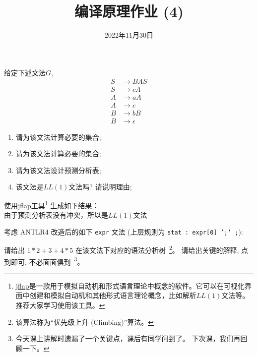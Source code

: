 \documentclass[a4paper, justified]{tufte-handout}
\title{编译原理作业 (4)}
\date{2022年11月30日}
\begin{document}
\maketitle
\noplagiarism %
\begin{abstract}
\end{abstract}
\beginrequired

\begin{problem}
  给定下述文法$G$,
  \begin{align}
    S &\to BAS \\[8pt]
    S &\to cA \\[8pt]
    A &\to aA \\[8pt]
    A &\to e \\[8pt]
    B &\to bB \\[8pt]
    B &\to \epsilon
  \end{align}

  \begin{enumerate}[(1)]
    \item 请为该文法计算必要的\first{}集合;
    \item 请为该文法计算必要的\follow{}集合;
    \item 请为该文法设计预测分析表;
    \item 该文法是$LL(1)$文法吗? 请说明理由;
  \end{enumerate}
\end{problem}

\begin{solution}
  使用jflap工具\footnote{
  	\href{https://www.jflap.org/jflaptmp/}{jflap}是一款用于模拟自动机和形式语言理论中概念的软件。它可以在可视化界面中创建和模拟自动机和其他形式语言理论概念，比如解析$LL(1)$文法等。推荐大家学习使用该工具。
  }
  生成如下结果：\\
  由于预测分析表没有冲突，所以是$LL(1)$文法
\end{solution}

\pagebreak
\begin{problem}
  考虑 ANTLR4 改造后的如下 \texttt{expr} 文法
  (上层规则为 \texttt{stat : expr[0] ';' ;}):


  \noindent 请给出 $1 \ast 2 + 3 + 4 \ast 5$
  在该文法下对应的语法分析树~\footnote{该算法称为``优先级上升 (Climbing)''算法。}。
  请给出关键的解释, 点到即可, 不必面面俱到~\footnote{
    今天课上讲解时遗漏了一个关键点，课后有同学问到了。
    下次课，我们再回顾一下。
  }。
\end{problem}
\end{document}
